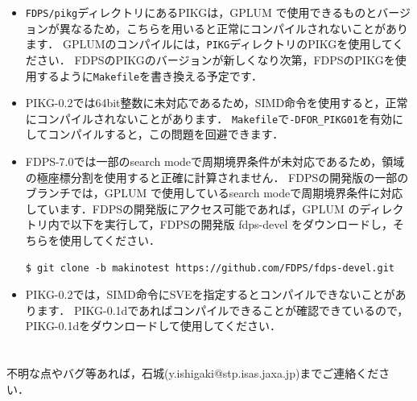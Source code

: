 \documentclass[12pt,a4paper,dvipdfmx]{jsarticle}
\newcommand{\ourcode}{GPLUM\xspace}
\begin{document}
\begin{itemize}
\item
\texttt{FDPS/pikg}ディレクトリにあるPIKGは，\ourcode で使用できるものとバージョンが異なるため，こちらを用いると正常にコンパイルされないことがあります．
GPLUMのコンパイルには，\texttt{PIKG}ディレクトリのPIKGを使用してください．
FDPSのPIKGのバージョンが新しくなり次第，FDPSのPIKGを使用するように\texttt{Makefile}を書き換える予定です．

\item
PIKG-0.2では64bit整数に未対応であるため，SIMD命令を使用すると，正常にコンパイルされないことがあります．
\texttt{Makefile}で\texttt{-DFOR\_PIKG01}を有効にしてコンパイルすると，この問題を回避できます．

\item
FDPS-7.0では一部のsearch modeで周期境界条件が未対応であるため，領域の極座標分割を使用すると正確に計算されません．
FDPSの開発版の一部のブランチでは，\ourcode で使用しているsearch modeで周期境界条件に対応しています．FDPSの開発版にアクセス可能であれば，\ourcode のディレクトリ内で以下を実行して，FDPSの開発版 fdps-devel をダウンロードし，そちらを使用してください．
\begin{verbatim}
$ git clone -b makinotest https://github.com/FDPS/fdps-devel.git
\end{verbatim}

\item
PIKG-0.2では，SIMD命令にSVEを指定するとコンパイルできないことがあります．
PIKG-0.1dであればコンパイルできることが確認できているので，PIKG-0.1dをダウンロードして使用してください．

\end{itemize}



\section*{}

不明な点やバグ等あれば，石城(y.ishigaki@stp.isas.jaxa.jp)までご連絡ください．
\end{document}
